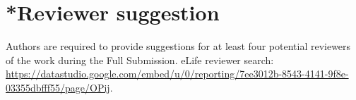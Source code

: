 \documentclass{article} %
\begin{document}
\section*{*Reviewer suggestion}
Authors are required to provide suggestions for at least four potential reviewers of the work during the Full Submission. eLife reviewer search:
\url{https://datastudio.google.com/embed/u/0/reporting/7ee3012b-8543-4141-9f8e-03355dbfff55/page/OPij}.

%

%
%
%
%
%
%
%
%
%
\end{document}
